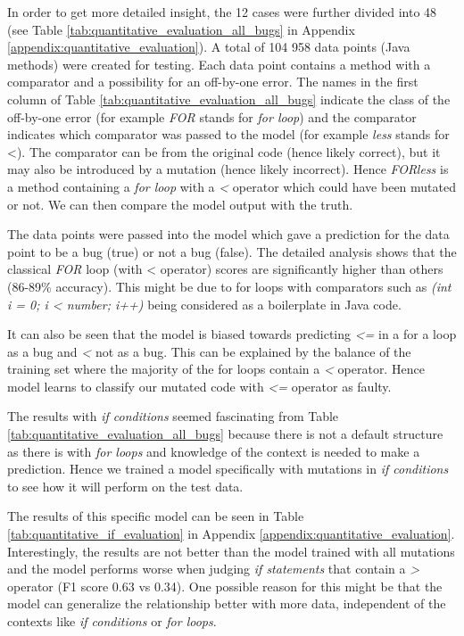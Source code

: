 In order to get more detailed insight, the 12 cases were further divided into 48 (see Table \ref{tab:quantitative_evaluation_all_bugs} in Appendix \ref{appendix:quantitative_evaluation}). A total of 104 958 data points (Java methods) were created for testing. Each data point contains a method with a comparator and a possibility for an off-by-one error. The names in the first column of Table \ref{tab:quantitative_evaluation_all_bugs} indicate the class of the off-by-one error (for example \textit{FOR} stands for \textit{for loop}) and the comparator indicates which comparator was passed to the model (for example \textit{less} stands for <). The comparator can be from the original code (hence likely correct), but it may also be introduced by a mutation (hence likely incorrect). Hence \textit{FORless} is a method containing a \textit{for loop} with a \textit{<} operator which could have been mutated or not. We can then compare the model output with the truth.

The data points were passed into the model which gave a prediction for the data point to be a bug (true) or not a bug (false). The detailed analysis shows that the classical \textit{FOR} loop (with < operator) scores are significantly higher than others (86-89\% accuracy). This might be due to for loops with comparators such as \textit{(int i = 0; i < number; i++) } being considered as a boilerplate in Java code.

It can also be seen that the model is biased towards predicting \textit{<=} in a for a loop as a bug and \textit{<} not as a bug. This can be explained by the balance of the training set where the majority of the for loops contain a \textit{<} operator. Hence model learns to classify our mutated code with \textit{<=} operator as faulty.

The results with \textit{if conditions} seemed fascinating from Table \ref{tab:quantitative_evaluation_all_bugs} because there is not a default structure as there is with \textit{for loops} and knowledge of the context is needed to make a prediction. Hence we trained a model specifically with mutations in \textit{if conditions} to see how it will perform on the test data.

The results of this specific model can be seen in Table \ref{tab:quantitative_if_evaluation} in Appendix \ref{appendix:quantitative_evaluation}. Interestingly, the results are not better than the model trained with all mutations and the model performs worse when judging \textit{if statements} that contain a \textit{>} operator (F1 score 0.63 vs 0.34). One possible reason for this might be that the model can generalize the relationship better with more data, independent of the contexts like \textit{if conditions} or \textit{for loops}.

